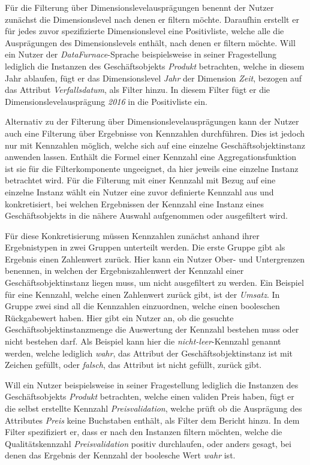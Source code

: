 \documentclass[
  language=german, %
  type=bachelor%
]{isthesis}
\begin{document}
\begin{content}
  Für die Filterung über Dimensionslevelausprägungen benennt der Nutzer
  zunächst die Dimensionslevel nach denen er filtern möchte. Daraufhin erstellt
  er für jedes zuvor spezifizierte Dimensionslevel eine Positivliste, welche
  alle die Ausprägungen des Dimensionslevels enthält, nach denen er filtern
  möchte. Will ein Nutzer der \textit{DataFurnace}-Sprache beispielsweise in
  seiner Fragestellung lediglich die Instanzen des Geschäftsobjekts
  \textit{Produkt} betrachten, welche in diesem Jahr ablaufen, fügt er das
  Dimensionslevel \textit{Jahr} der Dimension \textit{Zeit}, bezogen auf das
  Attribut \textit{Verfallsdatum}, als Filter hinzu. In diesem Filter fügt er
  die Dimensionslevelausprägung \textit{2016} in die Positivliste ein.

	Alternativ zu der Filterung über Dimensionslevelausprägungen kann der Nutzer
	auch eine Filterung über Ergebnisse von Kennzahlen durchführen. Dies ist
	jedoch nur mit Kennzahlen möglich, welche sich auf eine einzelne
	Geschäftsobjektinstanz anwenden lassen. Enthält die Formel einer Kennzahl
	eine Aggregationsfunktion ist sie für die Filterkomponente ungeeignet, da
	hier jeweils eine einzelne Instanz betrachtet wird. Für die Filterung mit
	einer Kennzahl mit Bezug auf eine einzelne Instanz wählt ein Nutzer eine
	zuvor definierte Kennzahl aus und konkretisiert, bei welchen Ergebnissen der
	Kennzahl eine Instanz eines Geschäftsobjekts in die nähere Auswahl
	aufgenommen oder ausgefiltert wird.

  Für diese Konkretisierung müssen Kennzahlen zunächst anhand ihrer
  Ergebnistypen in zwei Gruppen unterteilt werden. Die erste Gruppe gibt als
  Ergebnis einen Zahlenwert zurück. Hier kann ein Nutzer Ober- und Untergrenzen
  benennen, in welchen der Ergebniszahlenwert der Kennzahl einer
  Geschäftsobjektinstanz liegen muss, um nicht ausgefiltert zu werden. Ein
  Beispiel für eine Kennzahl, welche einen Zahlenwert zurück gibt, ist der
  \textit{Umsatz}. In Gruppe zwei sind all die Kennzahlen einzuordnen, welche
  einen booleschen Rückgabewert haben. Hier gibt ein Nutzer an, ob die gesuchte
  Geschäftsobjektinstanzmenge die Auswertung der Kennzahl bestehen muss oder
  nicht bestehen darf. Als Beispiel kann hier die \textit{nicht-leer}-Kennzahl
  genannt werden, welche lediglich \textit{wahr}, das Attribut der
  Geschäftsobjektinstanz ist mit Zeichen gefüllt, oder \textit{falsch}, das
  Attribut ist nicht gefüllt, zurück gibt.

  Will ein Nutzer beispielsweise in seiner Fragestellung lediglich die
  Instanzen des Geschäftsobjekts \textit{Produkt} betrachten, welche einen
  validen Preis haben, fügt er die selbst erstellte Kennzahl
  \textit{Preisvalidation}, welche prüft ob die Ausprägung des Attributes
  \textit{Preis} keine Buchstaben enthält, als Filter dem Bericht hinzu. In dem
  Filter spezifiziert er, dass er nach den Instanzen filtern möchten, welche
  die Qualitätskennzahl \textit{Preisvalidation} positiv durchlaufen, oder
  anders gesagt, bei denen das Ergebnis der Kennzahl der boolesche Wert
  \textit{wahr} ist.


\end{content}
\end{document}
